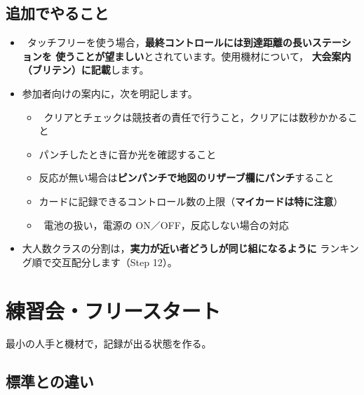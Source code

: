 \subsection*{追加でやること}

\begin{itemize}
\item \tSIAC\ タッチフリーを使う場合，\textbf{最終コントロールには到達距離の長いステーションを
      使うことが望ましい}とされています。使用機材について，
      \textbf{大会案内（ブリテン）に記載}します。
\item 参加者向けの案内に，次を明記します。
      \begin{itemize}
      \item \tSI\ クリアとチェックは競技者の責任で行うこと，クリアには数秒かかること
      \item パンチしたときに音か光を確認すること
      \item 反応が無い場合は\textbf{ピンパンチで地図のリザーブ欄にパンチ}すること
      \item カードに記録できるコントロール数の上限（\textbf{マイカードは特に注意}）
      \item \tSIAC\ 電池の扱い，電源の ON／OFF，反応しない場合の対応
      \end{itemize}
\item 大人数クラスの分割は，\textbf{実力が近い者どうしが同じ組になるように}
      ランキング順で交互配分します（Step 12）。
\end{itemize}

\section{練習会・フリースタート}
\tPRAC

\begin{GoalC}
最小の人手と機材で，記録が出る状態を作る。
\end{GoalC}

\subsection*{標準との違い}

